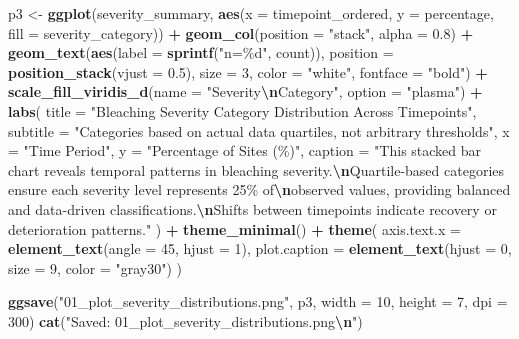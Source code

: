 \documentclass[
]{article}
\newenvironment{Shaded}{\begin{snugshade}}{\end{snugshade}}
\newcommand{\AttributeTok}[1]{\textcolor[rgb]{0.13,0.29,0.53}{#1}}
\newcommand{\DecValTok}[1]{\textcolor[rgb]{0.00,0.00,0.81}{#1}}
\newcommand{\FloatTok}[1]{\textcolor[rgb]{0.00,0.00,0.81}{#1}}
\newcommand{\FunctionTok}[1]{\textcolor[rgb]{0.13,0.29,0.53}{\textbf{#1}}}
\newcommand{\NormalTok}[1]{#1}
\newcommand{\OtherTok}[1]{\textcolor[rgb]{0.56,0.35,0.01}{#1}}
\newcommand{\SpecialCharTok}[1]{\textcolor[rgb]{0.81,0.36,0.00}{\textbf{#1}}}
\newcommand{\StringTok}[1]{\textcolor[rgb]{0.31,0.60,0.02}{#1}}
\begin{document}
\begin{Shaded}
\begin{Highlighting}[]
\NormalTok{p3 }\OtherTok{\textless{}{-}} \FunctionTok{ggplot}\NormalTok{(severity\_summary, }\FunctionTok{aes}\NormalTok{(}\AttributeTok{x =}\NormalTok{ timepoint\_ordered, }\AttributeTok{y =}\NormalTok{ percentage, }\AttributeTok{fill =}\NormalTok{ severity\_category)) }\SpecialCharTok{+}
  \FunctionTok{geom\_col}\NormalTok{(}\AttributeTok{position =} \StringTok{"stack"}\NormalTok{, }\AttributeTok{alpha =} \FloatTok{0.8}\NormalTok{) }\SpecialCharTok{+}
  \FunctionTok{geom\_text}\NormalTok{(}\FunctionTok{aes}\NormalTok{(}\AttributeTok{label =} \FunctionTok{sprintf}\NormalTok{(}\StringTok{"n=\%d"}\NormalTok{, count)), }
            \AttributeTok{position =} \FunctionTok{position\_stack}\NormalTok{(}\AttributeTok{vjust =} \FloatTok{0.5}\NormalTok{), }
            \AttributeTok{size =} \DecValTok{3}\NormalTok{, }\AttributeTok{color =} \StringTok{"white"}\NormalTok{, }\AttributeTok{fontface =} \StringTok{"bold"}\NormalTok{) }\SpecialCharTok{+}
  \FunctionTok{scale\_fill\_viridis\_d}\NormalTok{(}\AttributeTok{name =} \StringTok{"Severity}\SpecialCharTok{\textbackslash{}n}\StringTok{Category"}\NormalTok{, }\AttributeTok{option =} \StringTok{"plasma"}\NormalTok{) }\SpecialCharTok{+}
  \FunctionTok{labs}\NormalTok{(}
    \AttributeTok{title =} \StringTok{"Bleaching Severity Category Distribution Across Timepoints"}\NormalTok{,}
    \AttributeTok{subtitle =} \StringTok{"Categories based on actual data quartiles, not arbitrary thresholds"}\NormalTok{,}
    \AttributeTok{x =} \StringTok{"Time Period"}\NormalTok{, }
    \AttributeTok{y =} \StringTok{"Percentage of Sites (\%)"}\NormalTok{,}
    \AttributeTok{caption =} \StringTok{"This stacked bar chart reveals temporal patterns in bleaching severity.}\SpecialCharTok{\textbackslash{}n}\StringTok{Quartile{-}based categories ensure each severity level represents 25\% of}\SpecialCharTok{\textbackslash{}n}\StringTok{observed values, providing balanced and data{-}driven classifications.}\SpecialCharTok{\textbackslash{}n}\StringTok{Shifts between timepoints indicate recovery or deterioration patterns."}
\NormalTok{  ) }\SpecialCharTok{+}
  \FunctionTok{theme\_minimal}\NormalTok{() }\SpecialCharTok{+}
  \FunctionTok{theme}\NormalTok{(}
    \AttributeTok{axis.text.x =} \FunctionTok{element\_text}\NormalTok{(}\AttributeTok{angle =} \DecValTok{45}\NormalTok{, }\AttributeTok{hjust =} \DecValTok{1}\NormalTok{),}
    \AttributeTok{plot.caption =} \FunctionTok{element\_text}\NormalTok{(}\AttributeTok{hjust =} \DecValTok{0}\NormalTok{, }\AttributeTok{size =} \DecValTok{9}\NormalTok{, }\AttributeTok{color =} \StringTok{"gray30"}\NormalTok{)}
\NormalTok{  )}

\FunctionTok{ggsave}\NormalTok{(}\StringTok{"01\_plot\_severity\_distributions.png"}\NormalTok{, p3, }\AttributeTok{width =} \DecValTok{10}\NormalTok{, }\AttributeTok{height =} \DecValTok{7}\NormalTok{, }\AttributeTok{dpi =} \DecValTok{300}\NormalTok{)}
\FunctionTok{cat}\NormalTok{(}\StringTok{"Saved: 01\_plot\_severity\_distributions.png}\SpecialCharTok{\textbackslash{}n}\StringTok{"}\NormalTok{)}
\end{Highlighting}
\end{Shaded}
\end{document}

